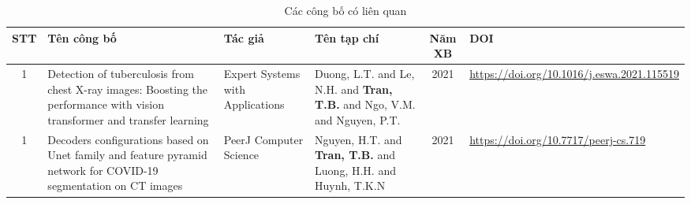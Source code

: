\documentclass[../the.tex]{subfiles}
\begin{document}
\thispagestyle{empty}


\begin{table*}[h!]
\centering
\begin{tabularx}{\columnwidth}{|c|X|X|X|c|X|}
\hline
\textbf{STT}
& \textbf{Tên công bố}
& \textbf{Tác giả}
& \textbf{Tên tạp chí}
& \textbf{Năm XB}
& \textbf{DOI}
\\ \hline 

1 & Detection of tuberculosis from chest X-ray images: Boosting the performance with vision transformer and transfer learning & Expert Systems with Applications & Duong, L.T. and Le, N.H. and \textbf{Tran, T.B.} and Ngo, V.M. and Nguyen, P.T. & 2021 &
\url{https://doi.org/10.1016/j.eswa.2021.115519} \\ \hline

1 & Decoders configurations based on Unet family and feature pyramid network for COVID-19 segmentation on CT images & PeerJ Computer Science & Nguyen, H.T. and \textbf{Tran, T.B.} and Luong, H.H. and Huynh, T.K.N  & 2021 & \url{https://doi.org/10.7717/peerj-cs.719} \\ \hline

\end{tabularx}
\label{tab:mc_frac}
\caption{Các công bố có liên quan}
\end{table*}
\end{document}
